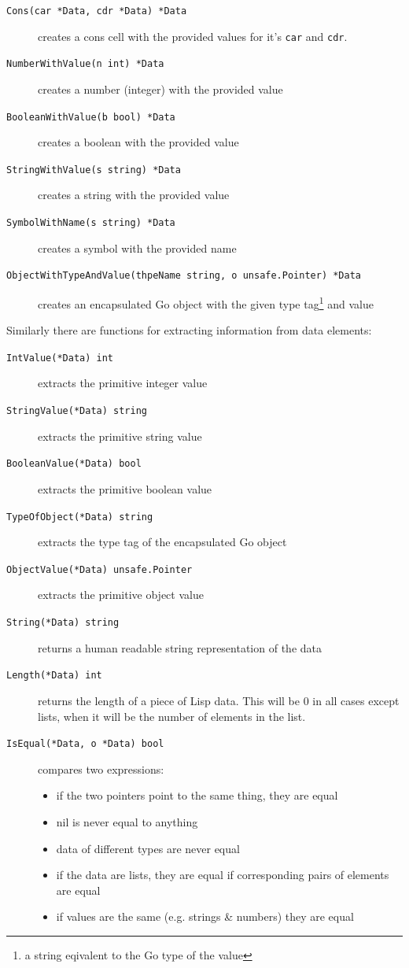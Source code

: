 \documentclass[12pt]{article}
\begin{document}
\begin{description}
\item [{\tt Cons(car *Data, cdr *Data) *Data}] creates a cons cell
  with the provided values for it's \verb|car| and \verb|cdr|.
\item [{\tt NumberWithValue(n int) *Data}] creates a number (integer)
  with the provided value
\item [{\tt BooleanWithValue(b bool) *Data}] creates a boolean with
  the provided value
\item [{\tt StringWithValue(s string) *Data}] creates a string with
  the provided value
\item [{\tt SymbolWithName(s string) *Data}] creates a symbol with the
  provided name
\item [{\tt ObjectWithTypeAndValue(thpeName string, o unsafe.Pointer) *Data}]
  creates an encapsulated Go object with the given type tag\footnote{a
    string eqivalent to the Go type of the value} and value 
\end{description}

\noindent Similarly there are functions for extracting information
from data elements: 

\begin{description}
\item [{\tt IntValue(*Data) int}] extracts the primitive integer value
\item [{\tt StringValue(*Data) string}] extracts the primitive
  string value
\item [{\tt BooleanValue(*Data) bool}] extracts the primitive
  boolean value
\item [{\tt TypeOfObject(*Data) string}] extracts the type tag of the
    encapsulated Go object
\item [{\tt ObjectValue(*Data) unsafe.Pointer}] extracts the
  primitive object value
\item [{\tt String(*Data) string}] returns a human readable string
  representation of the data 
\item [{\tt Length(*Data) int}] returns the length of a piece of Lisp 
  data. This will be 0 in all cases except lists, when it will be the
  number of elements in the list.
\item [{\tt IsEqual(*Data, o *Data) bool}] compares two expressions:
  \begin{itemize}
  \item if the two pointers point to the same thing, they are equal
  \item nil is never equal to anything
  \item data of different types are never equal
  \item if the data are lists, they are equal if corresponding pairs
    of elements are equal
  \item if values are the same (e.g. strings \& numbers) they are equal
  \end{itemize}
\end{description}
\end{document}
